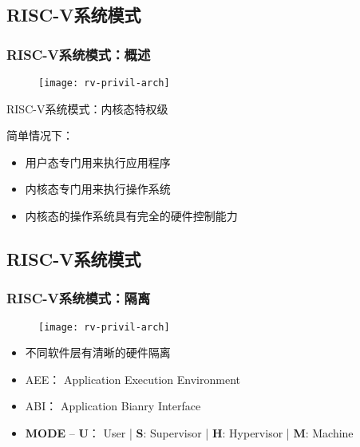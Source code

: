 \subsection{RISC-V系统模式}
\begin{frame}
    \frametitle{RISC-V系统模式：概述}
    
    \begin{figure}
        \centering
        \texttt{[image: rv-privil-arch]}
    \end{figure}

    RISC-V系统模式：内核态特权级
    
    简单情况下：
    \begin{itemize}
        \item 用户态专门用来执行应用程序
        \item 内核态专门用来执行操作系统
        \item 内核态的操作系统具有完全的硬件控制能力
        
    \end{itemize}
    
\end{frame}
\subsection{RISC-V系统模式}
\begin{frame}
	\frametitle{RISC-V系统模式：\small{隔离}}
	
	\begin{figure}
	\centering
	\texttt{[image: rv-privil-arch]}
	\end{figure}

\begin{itemize}
	
	\item 不同软件层有清晰的硬件隔离
	\item AEE： Application Execution Environment
	\item ABI： Application Bianry Interface
	\item \textbf{MODE} -- \textbf{U}： User | \textbf{S}: Supervisor | \textbf{H}: Hypervisor | \textbf{M}: Machine

\end{itemize}

\end{frame}

